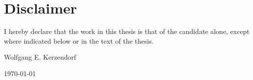 
\section*{Disclaimer}

I hereby declare that the work in this thesis is that of the candidate
alone, except where indicated below or in the text of the thesis.

\vspace{3cm}
\begin{flushright}
Wolfgang E. Kerzendorf

\today
\end{flushright}


